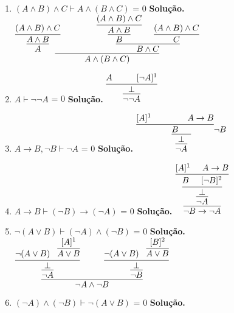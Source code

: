 \documentclass[a4paper]{article}
\newcommand{\answer}[2]{\ifnum#1= 0  {\color{blue} #2}\else \fi}
\begin{document}
\begin{enumerate}
\begin{enumerate}
{    }
\item $(A \land B) \land C \vdash A \land (B \land C)$ \newline
	\answer{0}{
    {\bf Solução.} \newline
    $\infer{A \land (B \land C)}{\infer{A}{\infer{A \land B}{(A \land B) \land C}} \hspace{1.5cm} \infer{B \land C}{\infer{B}{\infer{A \land B}{(A \land B) \land C}} \hspace{0.5cm} \infer{C}{(A \land B) \land C} }}$ \newline
    }
\item $A \vdash \neg\neg A$ \newline
	\answer{0}{
    {\bf Solução.} \newline
    	$ \infer{\neg{}\neg{}A}{\infer{\bot}{A \hspace{1cm}[\neg{}A]^1}}$ \newline
    }
\item $A \to B, \neg B \vdash \neg A$ \newline
	\answer{0}{
    {\bf Solução.} \newline
    	$\infer{\neg{}A}{\infer{\bot}{\infer{B}{[A]^1 \hspace{15mm} A \to B}\neg{}B}}$ \newline
    }
\item $A \to B \vdash (\neg B) \to (\neg A)$ \newline
	\answer{0}{
    {\bf Solução.} \newline
    $\infer{\neg{}B \to \neg{}A}{\infer{\neg{}A}{\infer{\bot}{\infer{B \hspace{5mm} [\neg{}B]^2}{[A]^1 \hspace{5mm} A \to B}}}}$
    }
\item $\neg(A \lor B) \vdash (\neg A) \land (\neg B)$ \newline
	\answer{0}{
    {\bf Solução.} \newline
    $\infer{\neg{}A \land \neg{}B}{\infer{\neg{}A}{\infer{\bot}{\neg{}(A \lor B) \hspace{3mm} \infer{A \lor B}{[A]^1}}} \hspace{10mm} \infer{\neg{}B}{\infer{\bot}{\neg{}(A \lor B) \hspace{3mm} \infer{A \lor B}{[B]^2}}}}$ \newline
    }
\item $(\neg A) \land (\neg B) \vdash \neg(A \lor B)$ \newline
	\answer{0}{
    {\bf Solução.} \newline
}
\end{enumerate}
\end{enumerate}
\end{document}
